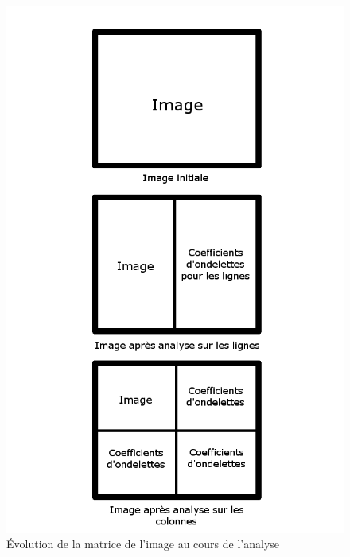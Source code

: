 \documentclass{article}
\begin{document}
\begin{figure}[!h]
\centering
\includegraphics[scale=0.5]{images/analyse.png}
\caption{Évolution de la matrice de l'image au cours de l'analyse}
\label{analyse}
\end{figure}
\end{document}
